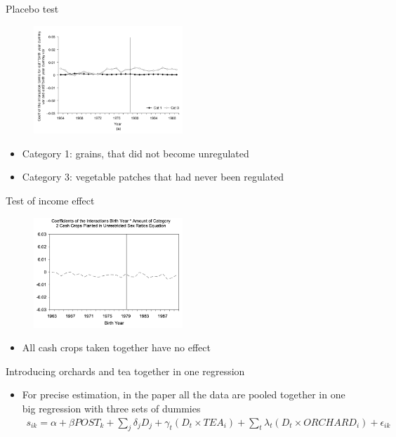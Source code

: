 \documentclass[11pt,notes=hide,aspectratio=169,mathserif]{beamer}
\begin{document}
\begin{frame}{Placebo test}
\begin{figure}
\centering
\includegraphics[width=0.5\textwidth]{inputs/fig3a.png}
\end{figure}
\begin{itemize}
\item Category 1: grains, that did not become unregulated
\item Category 3:  vegetable patches that had never been regulated
\end{itemize}
\end{frame}

\begin{frame}{Test of income effect}
\begin{figure}
\centering
\includegraphics[width=0.5\textwidth]{inputs/inc.png}
\end{figure}
\begin{itemize}
\item All cash crops taken together have no effect
\end{itemize}
\end{frame}

\begin{frame}{Introducing orchards and tea together in one regression}
\begin{itemize}
\item For precise estimation, in the paper all the data are pooled together in one big regression with three sets of dummies
\begin{align*}
    s_{ik} = \alpha + \beta POST_k + \sum_j \delta_j D_j +  \gamma_t (D_t \times TEA_i) + \sum_t \lambda_t (D_t \times ORCHARD_i) + \epsilon_{ik}
\end{align*}
\end{itemize}
\end{frame}
\end{document}
